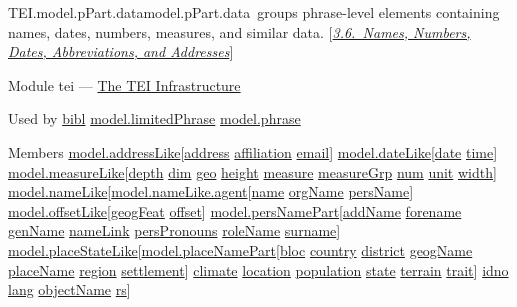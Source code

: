 \begin{reflist}
\item[]\begin{specHead}{TEI.model.pPart.data}{model.pPart.data} groups phrase-level elements containing names, dates, numbers, measures, and similar data. [\textit{\hyperref[CONA]{3.6.\ Names, Numbers, Dates, Abbreviations, and Addresses}}]\end{specHead} 
    \item[{Module}]
  tei — \hyperref[ST]{The TEI Infrastructure}
    \item[{Used by}]
  \hyperref[TEI.bibl]{bibl} \hyperref[TEI.model.limitedPhrase]{model.limitedPhrase} \hyperref[TEI.model.phrase]{model.phrase}
    \item[{Members}]
  \hyperref[TEI.model.addressLike]{model.addressLike}[\hyperref[TEI.address]{address} \hyperref[TEI.affiliation]{affiliation} \hyperref[TEI.email]{email}] \hyperref[TEI.model.dateLike]{model.dateLike}[\hyperref[TEI.date]{date} \hyperref[TEI.time]{time}] \hyperref[TEI.model.measureLike]{model.measureLike}[\hyperref[TEI.depth]{depth} \hyperref[TEI.dim]{dim} \hyperref[TEI.geo]{geo} \hyperref[TEI.height]{height} \hyperref[TEI.measure]{measure} \hyperref[TEI.measureGrp]{measureGrp} \hyperref[TEI.num]{num} \hyperref[TEI.unit]{unit} \hyperref[TEI.width]{width}] \hyperref[TEI.model.nameLike]{model.nameLike}[\hyperref[TEI.model.nameLike.agent]{model.nameLike.agent}[\hyperref[TEI.name]{name} \hyperref[TEI.orgName]{orgName} \hyperref[TEI.persName]{persName}] \hyperref[TEI.model.offsetLike]{model.offsetLike}[\hyperref[TEI.geogFeat]{geogFeat} \hyperref[TEI.offset]{offset}] \hyperref[TEI.model.persNamePart]{model.persNamePart}[\hyperref[TEI.addName]{addName} \hyperref[TEI.forename]{forename} \hyperref[TEI.genName]{genName} \hyperref[TEI.nameLink]{nameLink} \hyperref[TEI.persPronouns]{persPronouns} \hyperref[TEI.roleName]{roleName} \hyperref[TEI.surname]{surname}] \hyperref[TEI.model.placeStateLike]{model.placeStateLike}[\hyperref[TEI.model.placeNamePart]{model.placeNamePart}[\hyperref[TEI.bloc]{bloc} \hyperref[TEI.country]{country} \hyperref[TEI.district]{district} \hyperref[TEI.geogName]{geogName} \hyperref[TEI.placeName]{placeName} \hyperref[TEI.region]{region} \hyperref[TEI.settlement]{settlement}] \hyperref[TEI.climate]{climate} \hyperref[TEI.location]{location} \hyperref[TEI.population]{population} \hyperref[TEI.state]{state} \hyperref[TEI.terrain]{terrain} \hyperref[TEI.trait]{trait}] \hyperref[TEI.idno]{idno} \hyperref[TEI.lang]{lang} \hyperref[TEI.objectName]{objectName} \hyperref[TEI.rs]{rs}]
\end{reflist}  
